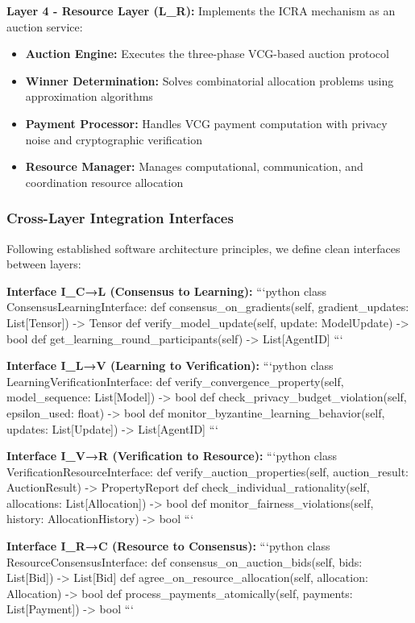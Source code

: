 \documentclass[conference]{IEEEtran}
\begin{document}
\textbf{Layer 4 - Resource Layer (L_R):} Implements the ICRA mechanism as an auction service:
\begin{itemize}
    \item \textbf{Auction Engine:} Executes the three-phase VCG-based auction protocol
    \item \textbf{Winner Determination:} Solves combinatorial allocation problems using approximation algorithms
    \item \textbf{Payment Processor:} Handles VCG payment computation with privacy noise and cryptographic verification
    \item \textbf{Resource Manager:} Manages computational, communication, and coordination resource allocation
\end{itemize}

\subsubsection{Cross-Layer Integration Interfaces}

Following established software architecture principles, we define clean interfaces between layers:

\textbf{Interface I_{C→L} (Consensus to Learning):}
```python
class ConsensusLearningInterface:
    def consensus_on_gradients(self, gradient_updates: List[Tensor]) -> Tensor
    def verify_model_update(self, update: ModelUpdate) -> bool
    def get_learning_round_participants(self) -> List[AgentID]
```

\textbf{Interface I_{L→V} (Learning to Verification):}
```python
class LearningVerificationInterface:
    def verify_convergence_property(self, model_sequence: List[Model]) -> bool
    def check_privacy_budget_violation(self, epsilon_used: float) -> bool
    def monitor_byzantine_learning_behavior(self, updates: List[Update]) -> List[AgentID]
```

\textbf{Interface I_{V→R} (Verification to Resource):}
```python
class VerificationResourceInterface:
    def verify_auction_properties(self, auction_result: AuctionResult) -> PropertyReport
    def check_individual_rationality(self, allocations: List[Allocation]) -> bool
    def monitor_fairness_violations(self, history: AllocationHistory) -> bool
```

\textbf{Interface I_{R→C} (Resource to Consensus):}
```python
class ResourceConsensusInterface:
    def consensus_on_auction_bids(self, bids: List[Bid]) -> List[Bid]
    def agree_on_resource_allocation(self, allocation: Allocation) -> bool
    def process_payments_atomically(self, payments: List[Payment]) -> bool
```
\end{document}
